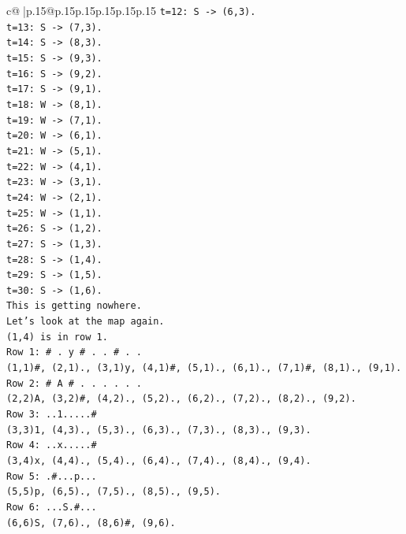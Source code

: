 \documentclass{article}
\begin{document}
{\begin{supertabular}{c@{$\;$}|p{.15\linewidth}@{}p{.15\linewidth}p{.15\linewidth}p{.15\linewidth}p{.15\linewidth}p{.15\linewidth}}
{{{\texttt{t=12: S {-}> (6,3).} \\
\texttt{t=13: S {-}> (7,3).} \\
\texttt{t=14: S {-}> (8,3).} \\
\texttt{t=15: S {-}> (9,3).} \\
\texttt{t=16: S {-}> (9,2).} \\
\texttt{t=17: S {-}> (9,1).} \\
\texttt{t=18: W {-}> (8,1).} \\
\texttt{t=19: W {-}> (7,1).} \\
\texttt{t=20: W {-}> (6,1).} \\
\texttt{t=21: W {-}> (5,1).} \\
\texttt{t=22: W {-}> (4,1).} \\
\texttt{t=23: W {-}> (3,1).} \\
\texttt{t=24: W {-}> (2,1).} \\
\texttt{t=25: W {-}> (1,1).} \\
\texttt{t=26: S {-}> (1,2).} \\
\texttt{t=27: S {-}> (1,3).} \\
\texttt{t=28: S {-}> (1,4).} \\
\texttt{t=29: S {-}> (1,5).} \\
\texttt{t=30: S {-}> (1,6).} \\
\texttt{This is getting nowhere.} \\
\texttt{Let's look at the map again.} \\
\texttt{(1,4) is in row 1.} \\
\texttt{Row 1: \# . y \# . . \# . .} \\
\texttt{(1,1)\#, (2,1)., (3,1)y, (4,1)\#, (5,1)., (6,1)., (7,1)\#, (8,1)., (9,1).} \\
\texttt{Row 2: \# A \# . . . . . .} \\
\texttt{(2,2)A, (3,2)\#, (4,2)., (5,2)., (6,2)., (7,2)., (8,2)., (9,2).} \\
\texttt{Row 3: ..1.....\#} \\
\texttt{(3,3)1, (4,3)., (5,3)., (6,3)., (7,3)., (8,3)., (9,3).} \\
\texttt{Row 4: ..x.....\#} \\
\texttt{(3,4)x, (4,4)., (5,4)., (6,4)., (7,4)., (8,4)., (9,4).} \\
\texttt{Row 5: .\#...p...} \\
\texttt{(5,5)p, (6,5)., (7,5)., (8,5)., (9,5).} \\
\texttt{Row 6: ...S.\#...} \\
\texttt{(6,6)S, (7,6)., (8,6)\#, (9,6).} \\
}}}
\end{supertabular}}
\end{document}
